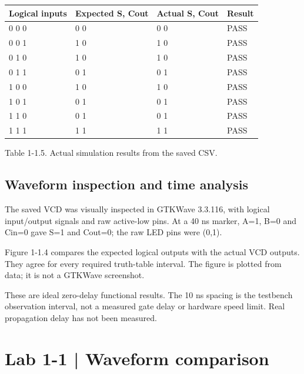 \documentclass[10pt,a4paper]{article}
\begin{document}
\begingroup\small\setlength{\tabcolsep}{4pt}
\renewcommand{\arraystretch}{1.20}
\noindent\begin{tabular}{@{}p{}p{}p{}p{}@{}}
\toprule
\textbf{Logical inputs} & \textbf{Expected S, Cout} & \textbf{Actual S, Cout} & \textbf{Result} \\
\midrule
0 0 0 & 0 0 & 0 0 & PASS \\
0 0 1 & 1 0 & 1 0 & PASS \\
0 1 0 & 1 0 & 1 0 & PASS \\
0 1 1 & 0 1 & 0 1 & PASS \\
1 0 0 & 1 0 & 1 0 & PASS \\
1 0 1 & 0 1 & 0 1 & PASS \\
1 1 0 & 0 1 & 0 1 & PASS \\
1 1 1 & 1 1 & 1 1 & PASS \\
\bottomrule
\end{tabular}\par\endgroup
\vspace{2mm}

{\small\raggedright Table 1-1.5. Actual simulation results from the saved CSV.\par}

\subsection*{Waveform inspection and time analysis}

The saved VCD was visually inspected in GTKWave 3.3.116, with logical input/output signals and raw active-low pins. At a 40 ns marker, A=1, B=0 and Cin=0 gave S=1 and Cout=0; the raw LED pins were (0,1).\par

Figure 1-1.4 compares the expected logical outputs with the actual VCD outputs. They agree for every required truth-table interval. The figure is plotted from data; it is not a GTKWave screenshot.\par

These are ideal zero-delay functional results. The 10 ns spacing is the testbench observation interval, not a measured gate delay or hardware speed limit. Real propagation delay has not been measured.\par

\clearpage

\section*{Lab 1-1 | Waveform comparison}
\end{document}
